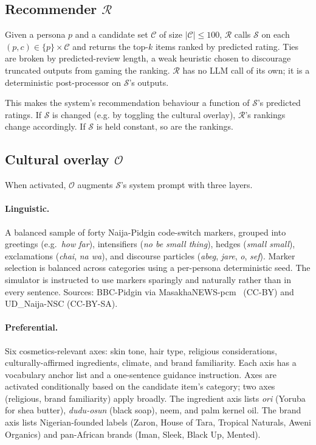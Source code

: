 \documentclass[8pt,twocolumn,a4paper]{extarticle}
\begin{document}
\subsection{Recommender $\mathcal{R}$}
\label{sec:method:rec}

Given a persona $p$ and a candidate set $\mathcal{C}$ of size $|\mathcal{C}| \le 100$, $\mathcal{R}$ calls $\mathcal{S}$ on each $(p, c) \in \{p\} \times \mathcal{C}$ and returns the top-$k$ items ranked by predicted rating. Ties are broken by predicted-review length, a weak heuristic chosen to discourage truncated outputs from gaming the ranking. $\mathcal{R}$ has no LLM call of its own; it is a deterministic post-processor on $\mathcal{S}$'s outputs.

This makes the system's recommendation behaviour a function of $\mathcal{S}$'s predicted ratings. If $\mathcal{S}$ is changed (e.g. by toggling the cultural overlay), $\mathcal{R}$'s rankings change accordingly. If $\mathcal{S}$ is held constant, so are the rankings.

\subsection{Cultural overlay $\mathcal{O}$}
\label{sec:method:overlay}

When activated, $\mathcal{O}$ augments $\mathcal{S}$'s system prompt with three layers.

\paragraph{Linguistic.}
A balanced sample of forty Naija-Pidgin code-switch markers, grouped into greetings (e.g.\ \textit{how far}), intensifiers (\textit{no be small thing}), hedges (\textit{small small}), exclamations (\textit{chai}, \textit{na wa}), and discourse particles (\textit{abeg}, \textit{jare}, \textit{o}, \textit{sef}). Marker selection is balanced across categories using a per-persona deterministic seed. The simulator is instructed to use markers sparingly and naturally rather than in every sentence. Sources: BBC-Pidgin via MasakhaNEWS-pcm~\citep{adelani2023masakhanews} (CC-BY) and UD\_Naija-NSC (CC-BY-SA).

\paragraph{Preferential.}
Six cosmetics-relevant axes: skin tone, hair type, religious considerations, culturally-affirmed ingredients, climate, and brand familiarity. Each axis has a vocabulary anchor list and a one-sentence guidance instruction. Axes are activated conditionally based on the candidate item's category; two axes (religious, brand familiarity) apply broadly. The ingredient axis lists \textit{ori} (Yoruba for shea butter), \textit{dudu-osun} (black soap), neem, and palm kernel oil. The brand axis lists Nigerian-founded labels (Zaron, House of Tara, Tropical Naturals, Aweni Organics) and pan-African brands (Iman, Sleek, Black Up, Mented).
\end{document}
